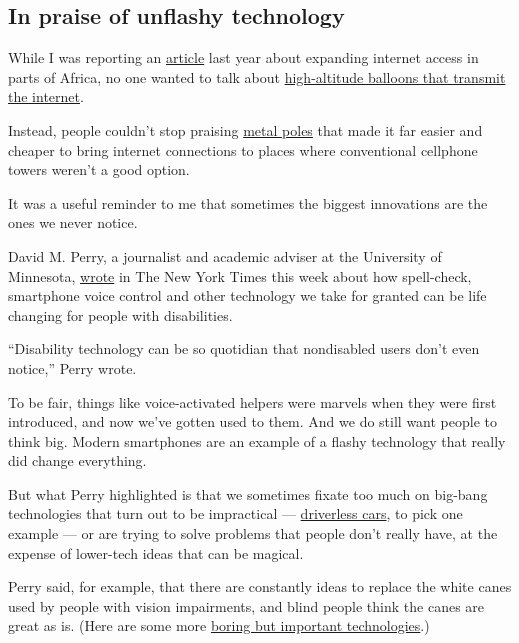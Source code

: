 \hypertarget{in-praise-of-unflashy-technology}{%
\subsection{In praise of unflashy
technology}\label{in-praise-of-unflashy-technology}}

While I was reporting an
\href{https://www.bloomberg.com/news/features/2019-06-07/the-next-big-phones-could-bring-a-billion-people-online?sref=7ooTCNG1}{article}
last year about expanding internet access in parts of Africa, no one
wanted to talk about
\href{https://www.nytimes3xbfgragh.onion/2020/07/07/world/africa/google-loon-balloon-kenya.html}{high-altitude
balloons that transmit the internet}.

Instead, people couldn't stop praising
\href{https://carrier.huawei.com/en/trends-and-insights/emsite/ruralstar}{metal
poles} that made it far easier and cheaper to bring internet connections
to places where conventional cellphone towers weren't a good option.

It was a useful reminder to me that sometimes the biggest innovations
are the ones we never notice.

David M. Perry, a journalist and academic adviser at the University of
Minnesota,
\href{https://www.nytimes3xbfgragh.onion/2020/07/14/style/assistive-technology.html}{wrote}
in The New York Times this week about how spell-check, smartphone voice
control and other technology we take for granted can be life changing
for people with disabilities.

``Disability technology can be so quotidian that nondisabled users don't
even notice,'' Perry wrote.

To be fair, things like voice-activated helpers were marvels when they
were first introduced, and now we've gotten used to them. And we do
still want people to think big. Modern smartphones are an example of a
flashy technology that really did change everything.

But what Perry highlighted is that we sometimes fixate too much on
big-bang technologies that turn out to be impractical ---
\href{https://www.nytimes3xbfgragh.onion/2020/05/13/technology/driverless-cars.html}{driverless
cars}, to pick one example --- or are trying to solve problems that
people don't really have, at the expense of lower-tech ideas that can be
magical.

Perry said, for example, that there are constantly ideas to replace the
white canes used by people with vision impairments, and blind people
think the canes are great as is. (Here are some more
\href{https://www.nytimes3xbfgragh.onion/2020/07/08/technology/internet-infrastructure.html}{boring
but important technologies}.)

